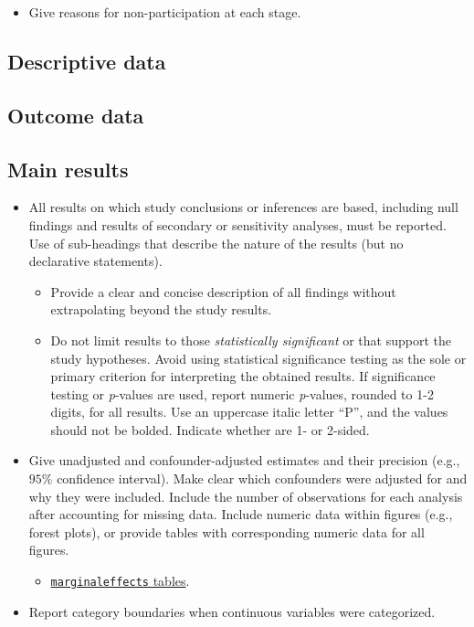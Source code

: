 \documentclass[
  letterpaper,
  DIV=11,
  numbers=noendperiod]{scrartcl}
\providecommand{\tightlist}{%
  \setlength{\itemsep}{0pt}\setlength{\parskip}{0pt}}\usepackage{longtable,booktabs,array}
\begin{document}
\begin{itemize}
\tightlist
\item
  Give reasons for non-participation at each stage.
\end{itemize}

\subsection{Descriptive data}\label{sec-res-pop-desc}

\subsection{Outcome data}\label{sec-res-out-desc}

\subsection{Main results}\label{sec-res-main}

\begin{itemize}
\tightlist
\item
  All results on which study conclusions or inferences are based,
  including null findings and results of secondary or sensitivity
  analyses, must be reported. Use of sub-headings that describe the
  nature of the results (but no declarative statements).

  \begin{itemize}
  \tightlist
  \item
    Provide a clear and concise description of all findings without
    extrapolating beyond the study results.
  \item
    Do not limit results to those \emph{statistically significant} or
    that support the study hypotheses. Avoid using statistical
    significance testing as the sole or primary criterion for
    interpreting the obtained results. If significance testing or
    \emph{p}-values are used, report numeric \emph{p}-values, rounded to
    1-2 digits, for all results. Use an uppercase italic letter ``P'',
    and the values should not be bolded. Indicate whether are 1- or
    2-sided.
  \end{itemize}
\item
  Give unadjusted and confounder-adjusted estimates and their precision
  (e.g., \(95\%\) confidence interval). Make clear which confounders
  were adjusted for and why they were included. Include the number of
  observations for each analysis after accounting for missing data.
  Include numeric data within figures (e.g., forest plots), or provide
  tables with corresponding numeric data for all figures.

  \begin{itemize}
  \tightlist
  \item
    \href{https://vincentarelbundock.github.io/marginaleffects/articles/tables.html}{\texttt{marginaleffects}
    tables}.
  \end{itemize}
\item
  Report category boundaries when continuous variables were categorized.
\end{itemize}
\end{document}
